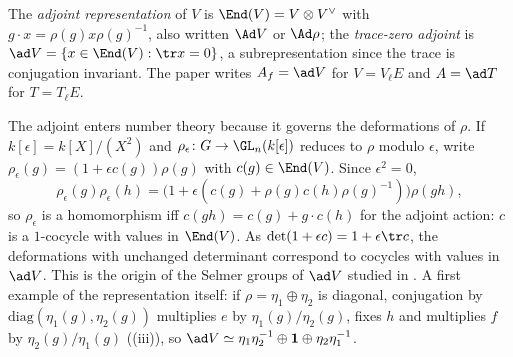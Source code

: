 \begin{definition}\label{def:reps:adjoint}
The \emph{adjoint representation} of $V$ is $\End(V)=V\otimes V^\vee$ with $g\cdot x=\rho(g)x\rho(g)^{-1}$, also written $\Ad V$ or $\Ad\rho$; the \emph{trace-zero
adjoint} is $\ad V=\{x\in\End(V):\tr x=0\}$, a subrepresentation since the trace is conjugation invariant. The paper writes $A_f=\ad V$ for
$V=V_\ell E$ and $A=\ad T$ for $T=T_\ell E$.
\end{definition}

The adjoint enters number theory because it governs the deformations of $\rho$. If $k[\epsilon]=k[X]/(X^2)$ and $\rho_\epsilon\colon G\to\GL_n(k[\epsilon])$
reduces to $\rho$ modulo $\epsilon$, write $\rho_\epsilon(g)=(1+\epsilon c(g))\rho(g)$ with $c(g)\in\End(V)$. Since $\epsilon^2=0$,
\[
\rho_\epsilon(g)\rho_\epsilon(h)=\bigl(1+\epsilon(c(g)+\rho(g)c(h)\rho(g)^{-1})\bigr)\rho(gh),
\]
so $\rho_\epsilon$ is a homomorphism iff $c(gh)=c(g)+g\cdot c(h)$ for the adjoint action: $c$ is a $1$-cocycle with values in $\End(V)$. As
$\det(1+\epsilon c)=1+\epsilon\tr c$, the deformations with unchanged determinant correspond to cocycles with values in $\ad V$. This is the origin of the
Selmer groups of $\ad V$ studied in . A first example of the representation itself: if $\rho=\eta_1\oplus\eta_2$ is diagonal,
conjugation by $\mathrm{diag}(\eta_1(g),\eta_2(g))$ multiplies $e$ by $\eta_1(g)/\eta_2(g)$, fixes $h$ and multiplies $f$ by $\eta_2(g)/\eta_1(g)$
((iii)), so $\ad V\simeq\eta_1\eta_2^{-1}\oplus\mathbf1\oplus\eta_2\eta_1^{-1}$.

